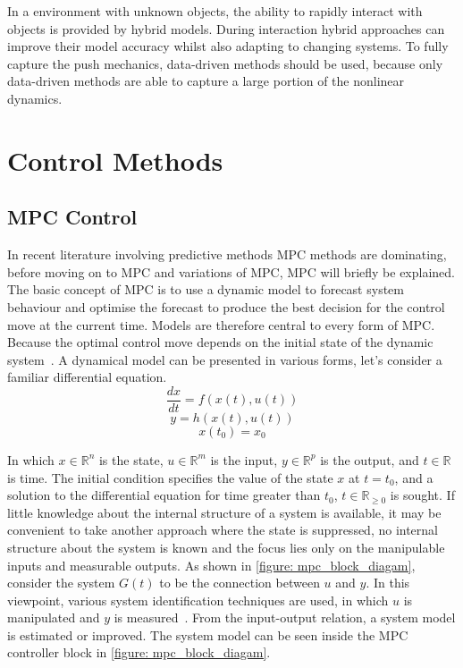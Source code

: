 In a environment with unknown objects, the ability to rapidly interact with objects is provided by hybrid models. During interaction hybrid approaches can improve their model accuracy whilst also adapting to changing systems. To fully capture the push mechanics, data-driven methods should be used, because only data-driven methods are able to capture a large portion of the nonlinear dynamics.

\chapter*{Control Methods}%

\section*{\ac{MPC} Control}
In recent literature involving predictive methods \acf{MPC} methods are dominating, before moving on to \ac{MPC} and variations of \ac{MPC}, \ac{MPC} will briefly be explained.  The basic concept of \ac{MPC} is to use a dynamic model to forecast system behaviour and optimise the forecast to produce the best decision for the control move at the current time. Models are therefore central to every form of \ac{MPC}. Because the optimal control move depends on the initial state of the dynamic system~\cite{rawlings_model_2020}. A dynamical model can be presented in various forms, let's consider a familiar differential equation.
$$ \frac{dx}{dt} = f(x(t), u(t)) $$
$$ y = h(x(t), u(t)) $$
$$ x(t_0) = x_0 $$

In which $x \in \mathbb{R}^n $ is the state, $u \in \mathbb{R}^m$ is the input, $y \in \mathbb{R}^p$ is the output, and $t \in \mathbb{R}$ is time. The initial condition specifies the value of the state $x$ at $t = t_0$, and a solution to the differential equation for time greater than $t_0$, $t \in \mathbb{R}_{\geq 0}$ is sought. If little knowledge about the internal structure of a system is available, it may be convenient to take another approach where the state is suppressed, no internal structure about the system is known and the focus lies only on the manipulable inputs and measurable outputs. As shown in \cref{figure: mpc_block_diagam}, consider the system $G(t)$ to be
the connection between $u$ and $y$. In this viewpoint, various system identification techniques are used, in which $u$ is manipulated and $y$ is measured~\cite{rawlings_model_2020}. From the input-output relation, a system model is estimated or improved. The system model can be seen inside the \ac{MPC} controller block in \cref{figure: mpc_block_diagam}.\\

